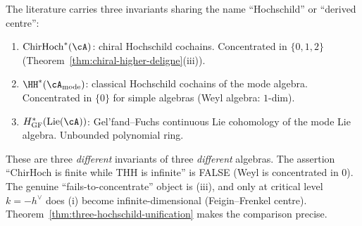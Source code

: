 \begin{remark}%
\label{rem:three-hochschild-invariants}%
%
The literature carries three invariants sharing the
name ``Hochschild'' or ``derived centre'':
\begin{enumerate}
 \item[\textup{(i)}] $\mathrm{ChirHoch}^*(\cA)$: chiral Hochschild
 cochains. Concentrated in $\{0,1,2\}$
 (Theorem~\ref{thm:chiral-higher-deligne}\textup{(iii)}).
 \item[\textup{(ii)}] $\HH^*(\cA_{\mathrm{mode}})$: classical
 Hochschild cochains of the mode algebra.
 Concentrated in $\{0\}$ for simple algebras (Weyl algebra: $1$-dim).
 \item[\textup{(iii)}] $H^*_{\mathrm{GF}}(\mathrm{Lie}(\cA))$:
 Gel'fand--Fuchs continuous Lie cohomology of the mode Lie algebra.
 Unbounded polynomial ring.
\end{enumerate}
These are three \emph{different} invariants of three \emph{different}
algebras. The assertion ``ChirHoch is finite while THH is infinite''
is FALSE (Weyl is concentrated in $0$). The genuine
``fails-to-concentrate'' object is (iii), and only at critical level
$k=-h^\vee$ does (i) become infinite-dimensional (Feigin--Frenkel
centre). Theorem~\ref{thm:three-hochschild-unification} makes the
comparison precise.
\end{remark}

